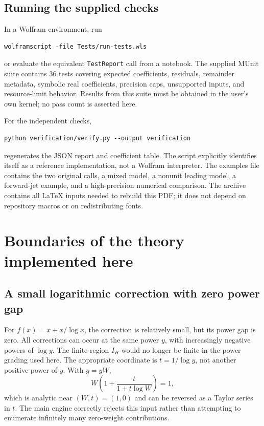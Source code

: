 \documentclass[11pt,a4paper]{article}
\numberwithin{equation}{section}
\theoremstyle{definition}
\theoremstyle{remark}
\begin{document}
\subsection{Running the supplied checks}

In a Wolfram environment, run
\begin{lstlisting}
wolframscript -file Tests/run-tests.wls
\end{lstlisting}
or evaluate the equivalent \texttt{TestReport} call from a notebook.
The supplied MUnit suite contains 36 tests covering expected coefficients,
residuals, remainder metadata, symbolic real coefficients, precision caps,
unsupported inputs, and resource-limit behavior. Results from this suite
must be obtained in the user's own kernel; no pass count is asserted here.

For the independent checks,
\begin{lstlisting}
python verification/verify.py --output verification
\end{lstlisting}
regenerates the JSON report and coefficient table. The script explicitly
identifies itself as a reference implementation, not a Wolfram interpreter.
The examples file contains the two original calls, a mixed model, a nonunit
leading model, a forward-jet example, and a high-precision numerical
comparison. The archive contains all LaTeX inputs needed to rebuild this
PDF; it does not depend on repository macros or on redistributing fonts.

\section{Boundaries of the theory implemented here}
\label{sec:extensions}

\subsection{A small logarithmic correction with zero power gap}

For $f(x)=x+x/\log x$, the correction is relatively small, but its power gap
is zero. All corrections can occur at the same power $y$, with increasingly
negative powers of $\log y$. The finite region $I_H$ would no longer be
finite in the power grading used here. The appropriate coordinate is
$t=1/\log y$, not another positive power of $y$. With $g=yW$,
\[
 W\left(1+\frac{t}{1+t\log W}\right)=1,
\]
which is analytic near $(W,t)=(1,0)$ and can be reversed as a Taylor series
in $t$. The main engine correctly rejects this input rather than attempting
to enumerate infinitely many zero-weight contributions.
\end{document}
